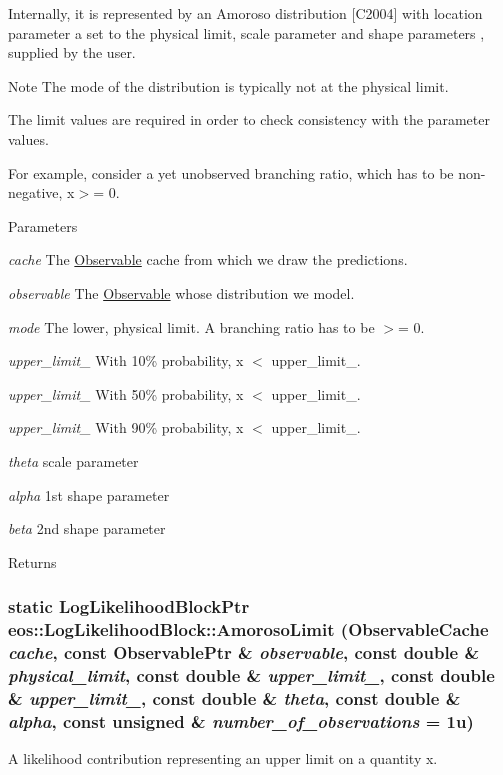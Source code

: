 Internally, it is represented by an Amoroso distribution \mbox{[}C2004\mbox{]} with location parameter a set to the physical limit, scale parameter  and shape parameters ,  supplied by the user.

\begin{DoxyNote}{Note}
The mode of the distribution is typically not at the physical limit.
\end{DoxyNote}
The limit values are required in order to check consistency with the parameter values.

For example, consider a yet unobserved branching ratio, which has to be non-\/negative, x$>$= 0.


\begin{DoxyParams}{Parameters}
\item[{\em cache}]The \hyperlink{classeos_1_1Observable}{Observable} cache from which we draw the predictions. \item[{\em observable}]The \hyperlink{classeos_1_1Observable}{Observable} whose distribution we model. \item[{\em mode}]The lower, physical limit. A branching ratio has to be $>$= 0. \item[{\em upper\_\-limit\_\-10}]With 10\% probability, x $<$ upper\_\-limit\_. \item[{\em upper\_\-limit\_\-50}]With 50\% probability, x $<$ upper\_\-limit\_. \item[{\em upper\_\-limit\_\-90}]With 90\% probability, x $<$ upper\_\-limit\_. \item[{\em theta}]scale parameter \item[{\em alpha}]1st shape parameter \item[{\em beta}]2nd shape parameter \end{DoxyParams}
\begin{DoxyReturn}{Returns}

\end{DoxyReturn}
\hypertarget{classeos_1_1LogLikelihoodBlock_a275a00c674dbc595abb1bc74faed20be}{
\subsubsection[{AmorosoLimit}]{\setlength{\rightskip}{0pt plus 5cm}static {\bf LogLikelihoodBlockPtr} eos::LogLikelihoodBlock::AmorosoLimit ({\bf ObservableCache} {\em cache}, \/  const {\bf ObservablePtr} \& {\em observable}, \/  const double \& {\em physical\_\-limit}, \/  const double \& {\em upper\_\-limit\_}, \/  const double \& {\em upper\_\-limit\_}, \/  const double \& {\em theta}, \/  const double \& {\em alpha}, \/  const unsigned \& {\em number\_\-of\_\-observations} = {\ttfamily 1u})}}
\label{classeos_1_1LogLikelihoodBlock_a275a00c674dbc595abb1bc74faed20be}
A likelihood contribution representing an upper limit on a quantity x.

